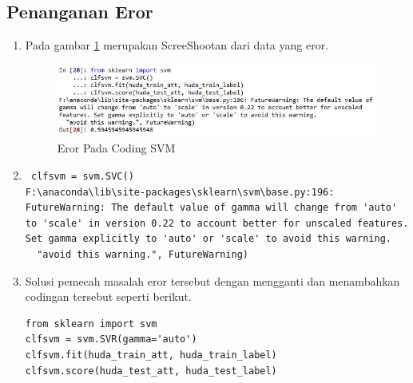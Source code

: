 \subsection{Penanganan Eror}
\begin{enumerate}
\item Pada gambar \ref{c4_16} merupakan ScreeShootan dari data yang eror.
\begin{figure}[ht]
	\centerline{\includegraphics[width=1\textwidth]{figures/huda/chapter4/eror.JPG}}
	\caption{Eror Pada Coding SVM}
	\label{c4_16}
\end{figure}
\item 
\begin{verbatim}
 clfsvm = svm.SVC()
F:\anaconda\lib\site-packages\sklearn\svm\base.py:196: FutureWarning: The default value of gamma will change from 'auto' to 'scale' in version 0.22 to account better for unscaled features. Set gamma explicitly to 'auto' or 'scale' to avoid this warning.
  "avoid this warning.", FutureWarning)
\end{verbatim}
\item Solusi pemecah masalah eror tersebut dengan mengganti dan menambahkan codingan tersebut seperti berikut.
\begin{verbatim}
from sklearn import svm
clfsvm = svm.SVR(gamma='auto')
clfsvm.fit(huda_train_att, huda_train_label)
clfsvm.score(huda_test_att, huda_test_label)
\end{verbatim}
\end{enumerate}